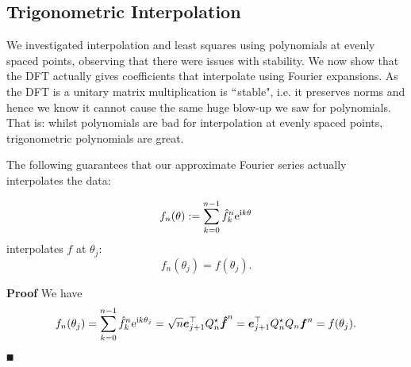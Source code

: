 \subsection{Trigonometric Interpolation}
We investigated  interpolation and least squares using polynomials at evenly spaced points, observing that there were issues with stability. We now show that the DFT actually gives coefficients that interpolate using Fourier expansions. As the DFT is a unitary matrix multiplication is \ensuremath{\ldq}stable", i.e. it preserves norms and hence we know it cannot cause the same huge blow-up we saw for polynomials. That is: whilst polynomials are bad for interpolation at evenly spaced points, trigonometric polynomials are great. 

The following guarantees that our approximate Fourier series actually interpolates the data:

\begin{corollary}[Interpolation]
\[
f_n(\theta) := \sum_{k=0}^{n-1} \hat f_k^n {\rm e}^{{\rm i} k \theta}
\]
interpolates $f$ at $\ensuremath{\theta}_j$:
\[
f_n(\ensuremath{\theta}_j) = f(\ensuremath{\theta}_j).
\]
\end{corollary}
\textbf{Proof} We have
\[
f_n(\theta_j) = \sum_{k=0}^{n-1} \hat f_k^n {\rm e}^{{\rm i} k \theta_j} = \sqrt n \bm{{\mbox{\boldmath$e$\unboldmath}}}_{j+1}^\top Q_n^\star {\mbox{\boldmath$\hat f$\unboldmath}}^n = \bm{{\mbox{\boldmath$e$\unboldmath}}}_{j+1}^\top Q_n^\star Q_n \bm{{\mbox{\boldmath$f$\unboldmath}}}^n = f(\theta_j).
\]
\ensuremath{\QED}

